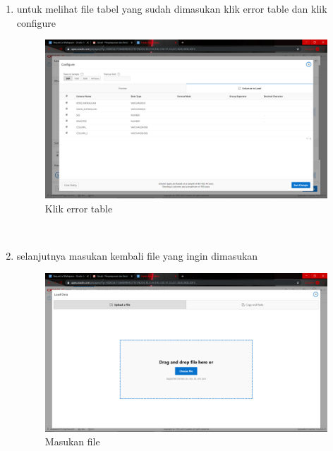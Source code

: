 \begin{enumerate}
\item untuk melihat file tabel yang sudah dimasukan klik error table dan klik configure
\begin{figure}[H]
    \centering
    \includegraphics[scale=0.2]{figures/16}
    \caption{Klik error table}
    \label{Environment2}
\end{figure} \\

\item selanjutnya masukan kembali file yang ingin dimasukan 
\begin{figure}[H]
    \centering
    \includegraphics[scale=0.2]{figures/17}
    \caption{Masukan file}
    \label{Environment3}
\end{figure} \\


\end{enumerate}
